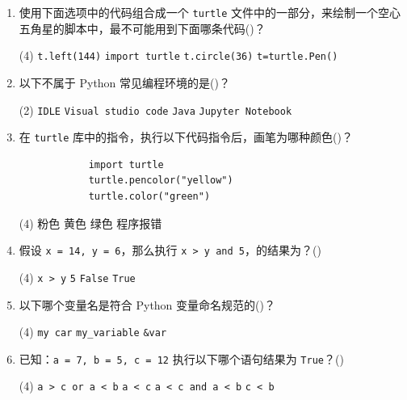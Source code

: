 \documentclass[11pt]{ctexart}
\begin{document}
\begin{enumerate}
        \item 使用下面选项中的代码组合成一个 \lstinline{turtle} 文件中的一部分，来绘制一个空心五角星的脚本中，最不可能用到下面哪条代码(\qquad)？
        \begin{tasks}(4)
            \task \lstinline{t.left(144)}
            \task \lstinline{import turtle}
            \task \lstinline{t.circle(36)}
            \task \lstinline{t=turtle.Pen()}
        \end{tasks}

        \item 以下不属于 Python 常见编程环境的是(\qquad)？
        \begin{tasks}(2)
            \task \lstinline{IDLE}
            \task \lstinline{Visual studio code}
            \task \lstinline{Java}
            \task \lstinline{Jupyter Notebook}
        \end{tasks}

        \item 在 \lstinline{turtle} 库中的指令，执行以下代码指令后，画笔为哪种颜色(\qquad)？
        \begin{lstlisting}
            import turtle
            turtle.pencolor("yellow")
            turtle.color("green")
        \end{lstlisting}
        \begin{tasks}(4)
            \task 粉色
            \task 黄色
            \task 绿色
            \task 程序报错
        \end{tasks}

        \item 假设 \lstinline{x = 14, y = 6}，那么执行 \lstinline{x > y and 5}，的结果为？(\qquad)
        \begin{tasks}(4)
            \task \lstinline{x > y}
            \task \lstinline{5}
            \task \lstinline{False}
            \task \lstinline{True}
        \end{tasks}

        \item 以下哪个变量名是符合 Python 变量命名规范的(\qquad)？
        \begin{tasks}(4)
            \task \lstinline{my car}
            \task \lstinline{my_variable}
            \task \lstinline{&var}
        \end{tasks}

        \item 已知：\lstinline{a = 7, b = 5, c = 12} 执行以下哪个语句结果为 \lstinline{True}？(\qquad)
        \begin{tasks}(4)
            \task \lstinline{a > c or a < b}
            \task \lstinline{a < c}
            \task \lstinline{a < c and a < b}
            \task \lstinline{c < b}
        \end{tasks}


\end{enumerate}
\end{document}
